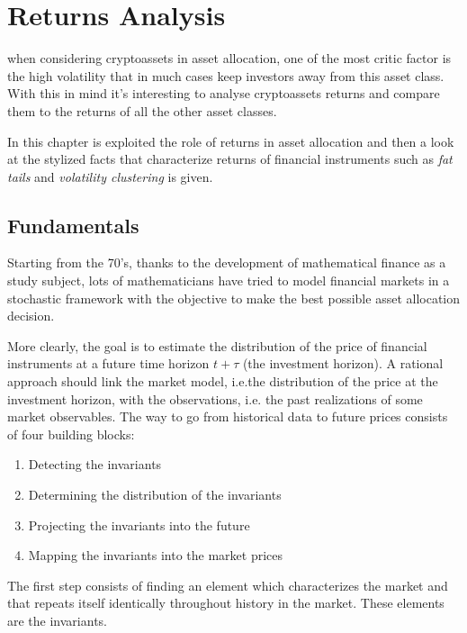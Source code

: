 \chapter{Returns Analysis}
\label{chpr:ch4}
\bigskip

when considering cryptoassets in asset allocation, one of the most critic factor is the high volatility that in much cases keep investors away from this asset class. With this in mind it's interesting to analyse cryptoassets returns and compare them to the returns of all the other asset classes.

\bigskip
In this chapter is exploited the role of returns in asset allocation and then a look at the stylized facts that characterize returns of financial instruments such as \textit{fat tails} and \textit{volatility clustering} is given.

\section{Fundamentals}
Starting from the 70's, thanks to the development of mathematical finance as a study subject, lots of mathematicians have tried to model financial markets in a stochastic framework with the objective to make the best possible asset allocation decision.

More clearly, the goal is to estimate the distribution of the price of financial instruments at a future time horizon $t+\tau$ (the investment horizon).  A rational approach should link the market model, i.e.the distribution of the price at the investment horizon, with the observations, i.e. the past realizations of some market observables.
The way to go from historical data to future prices consists of four building blocks:
\begin{enumerate}
    \item Detecting the invariants
    \item Determining the distribution of the invariants
    \item Projecting the invariants into the future
    \item Mapping the invariants into the market prices
\end{enumerate}

\noindent
The first step consists of finding an element which characterizes the market and that repeats itself identically throughout history in the market. These elements are the invariants.

